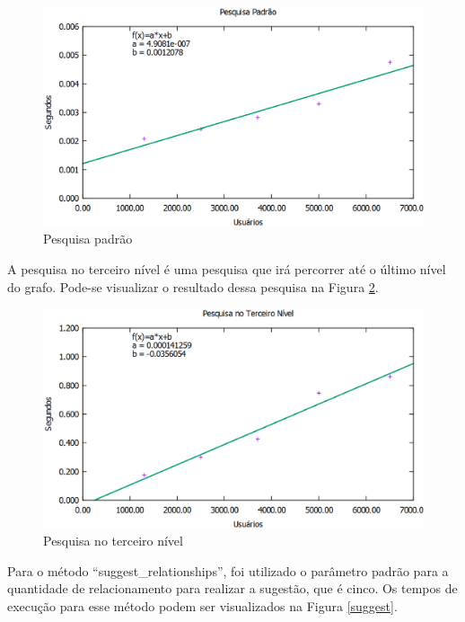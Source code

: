 \begin{figure}[!h]
	\centering
	\includegraphics[scale=0.55]{figuras/resultados/graficos/pesquisa_padrao.eps}
	\caption[Pesquisas]{Pesquisa padrão}
	\label{pesquisa_padrao}
\end{figure}

A pesquisa no terceiro nível é uma pesquisa que irá percorrer até o último nível do grafo. Pode-se visualizar o resultado dessa pesquisa na Figura \ref{pesquisa_3}.

\newpage

\begin{figure}[!h]
	\centering
	\includegraphics[scale=0.55]{figuras/resultados/graficos/pesquisa_3_nivel.eps}
	\caption[Pesquisas]{Pesquisa no terceiro nível}
	\label{pesquisa_3}
\end{figure}

Para o método ``suggest\_relationships'', foi utilizado o parâmetro padrão para a quantidade de relacionamento para realizar a sugestão, que é cinco. Os tempos de execução para esse método podem ser visualizados na Figura \ref{suggest}.


